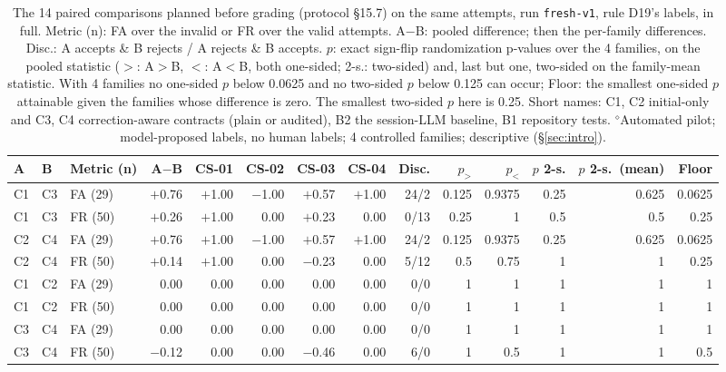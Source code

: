 \begin{table}[t]\centering\scriptsize\setlength{\tabcolsep}{4pt}
\caption{The 14 paired comparisons planned before grading (protocol \S15.7) on the same attempts, run \texttt{fresh-v1}, rule D19's labels, in full. Metric (n): FA over the invalid or FR over the valid attempts. A$-$B: pooled difference; then the per-family differences. Disc.: A accepts \& B rejects / A rejects \& B accepts. $p$: exact sign-flip randomization p-values over the 4 families, on the pooled statistic ($>$: A$>$B, $<$: A$<$B, both one-sided; 2-s.: two-sided) and, last but one, two-sided on the family-mean statistic. With 4 families no one-sided $p$ below 0.0625 and no two-sided $p$ below 0.125 can occur; Floor: the smallest one-sided $p$ attainable given the families whose difference is zero. The smallest two-sided $p$ here is 0.25. Short names: C1, C2 initial-only and C3, C4 correction-aware contracts (plain or audited), B2 the session-LLM baseline, B1 repository tests. $^{\diamond}$Automated pilot; model-proposed labels, no human labels; 4 controlled families; descriptive (\S\ref{sec:intro}).}\label{tab:fresh-comparisons-full}
\begin{tabular}{lllrrrrrrrrrrr}\toprule A & B & Metric (n) & A$-$B & CS-01 & CS-02 & CS-03 & CS-04 & Disc. & $p_{>}$ & $p_{<}$ & $p$ 2-s. & $p$ 2-s.\ (mean) & Floor \\\midrule
C1 & C3 & FA (29) & \ensuremath{+}0.76 & \ensuremath{+}1.00 & \ensuremath{-}1.00 & \ensuremath{+}0.57 & \ensuremath{+}1.00 & 24/2 & 0.125 & 0.9375 & 0.25 & 0.625 & 0.0625 \\
C1 & C3 & FR (50) & \ensuremath{+}0.26 & \ensuremath{+}1.00 & 0.00 & \ensuremath{+}0.23 & 0.00 & 0/13 & 0.25 & 1 & 0.5 & 0.5 & 0.25 \\
C2 & C4 & FA (29) & \ensuremath{+}0.76 & \ensuremath{+}1.00 & \ensuremath{-}1.00 & \ensuremath{+}0.57 & \ensuremath{+}1.00 & 24/2 & 0.125 & 0.9375 & 0.25 & 0.625 & 0.0625 \\
C2 & C4 & FR (50) & \ensuremath{+}0.14 & \ensuremath{+}1.00 & 0.00 & \ensuremath{-}0.23 & 0.00 & 5/12 & 0.5 & 0.75 & 1 & 1 & 0.25 \\
C1 & C2 & FA (29) & 0.00 & 0.00 & 0.00 & 0.00 & 0.00 & 0/0 & 1 & 1 & 1 & 1 & 1 \\
C1 & C2 & FR (50) & 0.00 & 0.00 & 0.00 & 0.00 & 0.00 & 0/0 & 1 & 1 & 1 & 1 & 1 \\
C3 & C4 & FA (29) & 0.00 & 0.00 & 0.00 & 0.00 & 0.00 & 0/0 & 1 & 1 & 1 & 1 & 1 \\
C3 & C4 & FR (50) & \ensuremath{-}0.12 & 0.00 & 0.00 & \ensuremath{-}0.46 & 0.00 & 6/0 & 1 & 0.5 & 1 & 1 & 0.5 \\

\end{tabular}
\end{table}
